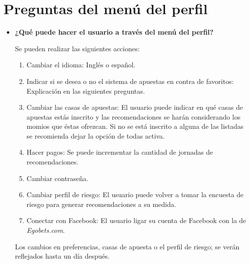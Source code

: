 \section{Preguntas del menú del perfil}
\begin{itemize}

\item \textbf{¿Qué puede hacer el usuario a través del menú del perfil?}


Se pueden realizar las siguientes acciones:
\begin{enumerate}

\item Cambiar el idioma: Inglés o español.
\item Indicar si se desea o no el sistema de apuestas en contra de favoritos: Explicación en las siguientes preguntas.
\item Cambiar las casas de apuestas: El usuario puede indicar en qué casas de apuestas estás inscrito y las recomendaciones se harán considerando los momios que éstas ofrezcan. Si no se está inscrito a alguna de las listadas se recomienda dejar la opción de todas activa.
\item Hacer pagos: Se puede incrementar la cantidad de jornadas de recomendaciones.
\item Cambiar contraseña.
\item Cambiar perfil de riesgo: El usuario puede volver a tomar la encuesta de riesgo para generar recomendaciones a su medida.
\item Conectar con Facebook: El usuario ligar su cuenta de Facebook con la de \emph{Egobets.com}.
\end{enumerate}

Los cambios en preferencias, casas de apuesta o el perfil de riesgo; se verán reflejados hasta un día después.
\end{itemize}


